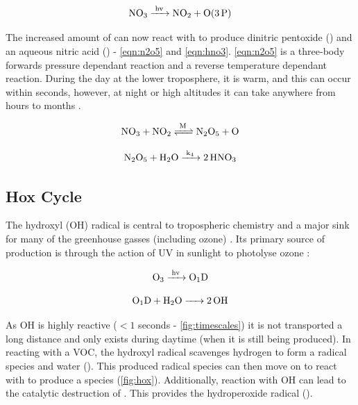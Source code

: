 \begin{equation}
  \ce{NO3 ->[hv] NO2 + O(3P)}
  \label{eqn:nno3}
\end{equation}


 The increased amount of  can now react with  to produce dinitric pentoxide () and an aqueous nitric acid () - \autoref{eqn:n2o5} and \autoref{eqn:hno3}. \autoref{eqn:n2o5} is a three-body forwards pressure dependant reaction and a reverse temperature dependant reaction. During the day at the lower troposphere, it is warm, and this can occur within seconds, however, at night or high altitudes it can take anywhere from hours to months \citep{fundamentals}.


\begin{equation}
  \ce{NO3 + NO2 <=>[M] N2O5 + O}
  \label{eqn:n2o5}
\end{equation}

\begin{equation}
  \ce{N2O5 + H2O ->[k4] 2HNO3}
  \label{eqn:hno3}
\end{equation}



\subsection{Hox Cycle}
The hydroxyl (OH) radical is central to tropospheric chemistry and a major sink for many of the greenhouse gasses (including ozone) \citep{olson}. Its primary source of production is through the action of UV in sunlight to photolyse ozone \citep{fundamentals}:


\begin{equation}
  \ce{O3 ->[hv] O1D}
\end{equation}

\begin{equation}
  \ce{O1D + H2O -> 2OH}
\end{equation}

As OH is highly reactive ($<1$ seconds - \autoref{fig:timescales}) it is not transported a long distance and only exists during daytime (when it is still being produced). In reacting with a VOC, the hydroxyl radical scavenges hydrogen to form a radical species and water (). This produced radical species can then move on to react with  to produce a  species (\autoref{fig:hox}). Additionally, reaction with OH can lead to the catalytic destruction of . This provides the hydroperoxide radical ().

